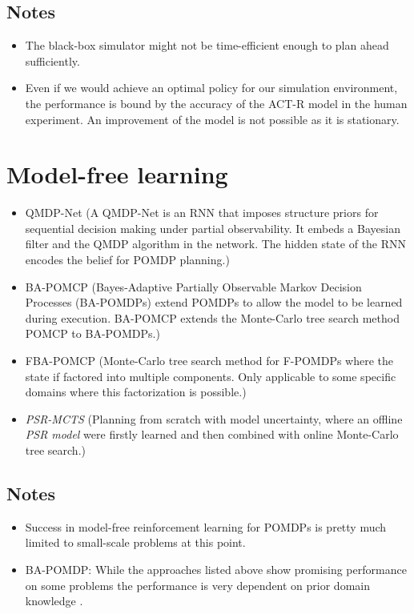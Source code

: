 \subsection{Notes}

\begin{itemize}
    \item The black-box simulator might not be time-efficient enough to plan ahead sufficiently.
    \item Even if we would achieve an optimal policy for our simulation environment, the performance is bound by the accuracy of the ACT-R model in the human experiment. An improvement of the model is not possible as it is stationary.
\end{itemize}

\section{Model-free learning}

\begin{itemize}
    \item QMDP-Net (A QMDP-Net is an RNN that imposes structure priors for sequential decision making under partial observability. It embeds a Bayesian filter and the QMDP algorithm in the network. The hidden state of the RNN encodes the belief for POMDP planning.)
    \item BA-POMCP (Bayes-Adaptive Partially Observable Markov Decision Processes (BA-POMDPs) extend POMDPs to allow the model to be learned during execution. BA-POMCP extends the Monte-Carlo tree search method POMCP to BA-POMDPs.)
    \item FBA-POMCP (Monte-Carlo tree search method for F-POMDPs where the state if factored into multiple components. Only applicable to some specific domains where this factorization is possible.)
    \item \emph{PSR-MCTS} (Planning from scratch with model uncertainty, where an offline \emph{PSR model} were firstly learned and then combined with online Monte-Carlo tree search.)
\end{itemize}

\subsection{Notes}

\begin{itemize}
    \item Success in model-free reinforcement learning for POMDPs is pretty much limited to small-scale problems at this point.
    \item BA-POMDP: While the approaches listed above show promising performance on some problems the performance is very dependent on prior domain knowledge \parencite{ba-pomdp-online-offline}.
\end{itemize}